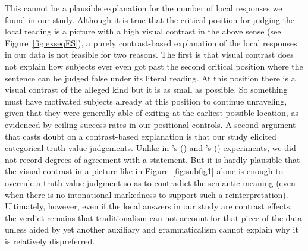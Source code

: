 \documentclass[fleqn,reqno,10pt,draft]{article}
\begin{document}
This cannot be a plausible explanation for the number of local
responses we found in our study. Although it is true that the critical
position for judging the local reading is a picture with a high visual
contrast in the above sense (see Figure~\ref{fig:exseqES}), a purely
contrast-based explanation of the local responses in our data is not
feasible for two reasons. The first is that visual contrast does not
explain how subjects ever even got past the second critical position
where the sentence can be judged false under its literal reading. At
this position there is a visual contrast of the alleged kind but it is
as small as possible. So something must have motivated subjects
already at this position to continue unraveling, given that they were
generally able of exiting at the earliest possible location, as
evidenced by ceiling success rates in our positional controls. A second
argument that casts doubt on a contrast-based explanation is that our
study elicited categorical truth-value judgements. Unlike in
\citeauthor{ChemlaSpector2010:Experimental-Ev}'s
(\citeyear{ChemlaSpector2010:Experimental-Ev}) and
\citeauthor{GeurtsTielvan-Tiel2013:Scalar-expressi}'s
(\citeyear{GeurtsTielvan-Tiel2013:Scalar-expressi}) experiments, we
did not record degrees of agreement with a statement. But it is hardly
plausible that the visual contrast in a picture like in
Figure~\ref{fig:subfig1} alone is enough to overrule a truth-value
judgment so as to contradict the semantic meaning (even when there is
no intonational markedness to support such a
reinterpretation). Ultimately, however, even if the local answers in
our study are contrast effects, the verdict remains that
traditionalism can not account for that piece of the data unless aided
by yet another auxiliary and grammaticalism cannot explain why it is
relatively dispreferred.

\end{document}
